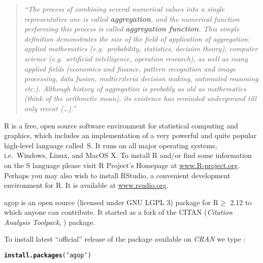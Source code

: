 \documentclass[11pt]{article}\usepackage[]{graphicx}\usepackage[]{color}
\makeatletter
\newcommand{\hlstr}[1]{\textcolor[rgb]{0.192,0.494,0.8}{#1}}%
\newcommand{\hlstd}[1]{\textcolor[rgb]{0.345,0.345,0.345}{#1}}%
\newcommand{\hlkwd}[1]{\textcolor[rgb]{0.737,0.353,0.396}{\textbf{#1}}}%
\newenvironment{kframe}{%
 \def\at@end@of@kframe{}%
 \ifinner\ifhmode%
  \def\at@end@of@kframe{\end{minipage}}%
  \begin{minipage}{\columnwidth}%
 \fi\fi%
 \def\FrameCommand##1{\hskip\@totalleftmargin \hskip-\fboxsep
 \colorbox{shadecolor}{##1}\hskip-\fboxsep
     \hskip-\linewidth \hskip-\@totalleftmargin \hskip\columnwidth}%
 \MakeFramed {\advance\hsize-\width
   \@totalleftmargin\z@ \linewidth\hsize
   \@setminipage}}%
 {\par\unskip\endMakeFramed%
 \at@end@of@kframe}
\newenvironment{knitrout}{}{} %
\newcommand{\package}[1]{\textsf{#1}\xspace}
\newcommand{\program}[1]{\textsf{#1}\xspace}
\newcommand{\os}[1]{\textsf{#1}\xspace}
\newcommand{\lang}[1]{\textsf{#1}\xspace}
\newcommand{\R}{\lang{R}}
\theoremstyle{remark}
\theoremstyle{definition}
\newif\ifDevelopmentVersion
\makeatother
\begin{document}
\begin{quotation}\it\noindent
``The process of combining several numerical values into a single
representative one is called \textbf{aggregation}, and the numerical function
performing this process is called \textbf{aggregation function}.
This simple definition
demonstrates the size of the field of application of aggregation:
applied mathematics
(e.g.~probability, statistics, decision theory), computer science
(e.g.~artificial
intelligence, operation research), as well as many applied fields
(economics and finance,
pattern recognition and image processing, data fusion,
multicriteria decision making,
automated reasoning etc.). Although history of aggregation is probably
as old as mathematics (think of the arithmetic mean), its existence
has reminded underground till only recent (\dots).''
\cite[p.~xiii]{GrabischETAL2009:aggregationfunctions}
\end{quotation}


\bigskip
\R \cite{Rproject:home} is a free, open source software environment
for statistical computing and graphics, which
includes an implementation
of a very powerful and quite popular high-level language called~\lang{S}.
It runs on all major operating systems, i.e.~\os{Windows},
\os{Linux}, and \os{MacOS X}.
To install \R and/or find some information on the \lang{S} language
please visit \R Project's Homepage at \href{http://www.R-project.org}{www.R-project.org}.
Perhaps you may also wish to install  \program{RStudio},
a convenient development environment for \R.
It is available at \href{http://rstudio.org/}{www.rsudio.org}.


\bigskip
\package{agop} is an open source (licensed under GNU LGPL 3)
package for \R$\ge$ 2.12 to which anyone can contribute.
It started as a fork of the \package{CITAN} (\textit{Citation
Analysis Toolpack}, \cite{Gagolewski2011:CITAN}) package.

To install latest ``official'' release of the
package available on \textit{CRAN} we type%
\ifDevelopmentVersion%
\footnote{You are viewing the \textbf{development} version of the tutorial.
Some of the features presented in this document may be missing
in the CRAN release. Please, upgrade to the \textbf{latest} development version from
\href{https://github.com/Rexamine/agop}{\textit{GitHub}}
if you need the new functionality.
Note that you will need a working \lang{C}/\lang{C++} compiler.}\ignorespaces
\fi%
:

\begin{knitrout}\small
{}\color{fgcolor}\begin{kframe}
\begin{alltt}
\hlkwd{install.packages}\hlstd{(}\hlstr{'agop'}\hlstd{)}
\end{alltt}
\end{kframe}
\end{knitrout}
\end{document}
